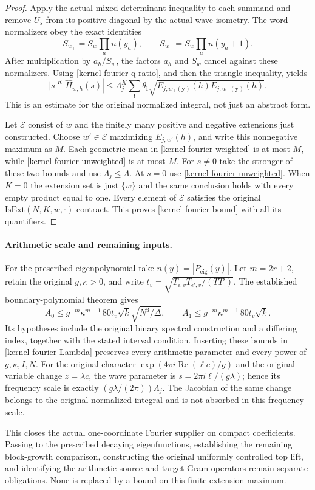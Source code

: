 \begin{proof}
Apply the actual mixed determinant inequality to each
summand and remove $U_s$ from its positive diagonal by
the actual wave isometry.  The word normalizers obey the
exact identities
\[
 S_{w_+}=S_w\prod_a n(y_a),\qquad
 S_{w_-}=S_w\prod_a n(y_a+1).
\]
After multiplication by $a_h/S_w$, the factors $a_h$ and
$S_w$ cancel against these normalizers.  Using
\eqref{kernel-fourier-q-ratio}, and then the triangle
inequality, yields
\begin{equation}\label{kernel-fourier-weighted}
 |s|^K|\widehat H_{w,h}(s)|
  \le \Lambda_j^K\sum_{\boldsymbol i}\theta_{\boldsymbol i}
       \sqrt{E_{j,w_+(\boldsymbol y)}(h)
                     E_{j,w_-(\boldsymbol y)}(h)}.
\end{equation}
This is an estimate for the original normalized integral,
not just an abstract form.

Let $\mathcal E$ consist of $w$ and the finitely many
positive and negative extensions just constructed.
Choose $w'\in\mathcal E$ maximizing $E_{j,w'}(h)$, and
write this nonnegative maximum as $M$.  Each geometric
mean in \eqref{kernel-fourier-weighted} is at most $M$,
while \eqref{kernel-fourier-unweighted} is at most $M$.
For $s\ne0$ take the stronger of these two bounds and
use $\Lambda_j\le\Lambda$.  At $s=0$ use
\eqref{kernel-fourier-unweighted}.  When $K=0$ the
extension set is just $\{w\}$ and the same conclusion
holds with every empty product equal to one.  Every
element of $\mathcal E$ satisfies the original
$\mathrm{IsExt}(N,K,w,\cdot)$ contract.  This proves
\eqref{kernel-fourier-bound} with all its quantifiers.
\end{proof}

\paragraph{Arithmetic scale and remaining inputs.}
For the prescribed eigenpolynomial take $n(y)=|P_{\mathrm{eig}}(y)|$.
Let $m=2r+2$, retain the original $g,\kappa>0$, and write
$t_v=\sqrt{T_{\epsilon,v}T_{\epsilon',v}/(TT')}$.
The established boundary-polynomial theorem gives
\[
 A_0\le g^{-m}\kappa^{m-1}\,80t_v\sqrt{k}
                       \sqrt{N^3/\Delta},\qquad
 A_1\le g^{-m}\kappa^{m-1}\,80t_v\sqrt{k}.
\]
Its hypotheses include the original binary spectral
construction and a differing index, together with the
stated interval condition.  Inserting these bounds in
\eqref{kernel-fourier-Lambda} preserves every arithmetic
parameter and every power of $g,\kappa,I,N$.
For the original character
$\exp(4\pi i\operatorname{Re}(\ell c)/g)$ and the original
variable change $z=\lambda c$, the wave parameter is
$s=2\pi i\ell/(g\lambda)$; hence its frequency scale is
exactly $(g\lambda/(2\pi))\Lambda_j$.  The Jacobian of the
same change belongs to the original normalized integral
and is not absorbed in this frequency scale.

This closes the actual one-coordinate Fourier supplier on
compact coefficients.  Passing to the prescribed decaying
eigenfunctions, establishing the remaining block-growth
comparison, constructing the original uniformly controlled
top lift, and identifying the arithmetic source and target
Gram operators remain separate obligations.  None is
replaced by a bound on this finite extension maximum.
